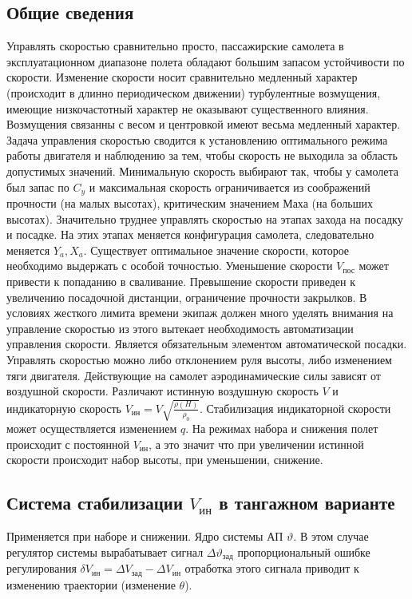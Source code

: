 \documentclass{article}
\begin{document}
\subsection{Общие сведения}
Управлять скоростью сравнительно просто, пассажирские самолета в
эксплуатационном диапазоне полета обладают большим запасом устойчивости по
скорости. Изменение скорости носит сравнительно медленный характер (происходит
в длинно периодическом движении) турбулентные возмущения, имеющие
низкочастотный характер не оказывают существенного влияния.
Возмущения связанны с весом и центровкой имеют весьма медленный характер.
Задача управления скоростью сводится к установлению оптимального режима работы
двигателя и наблюдению за тем, чтобы скорость не выходила за область допустимых
значений.
Минимальную скорость выбирают так, чтобы у самолета был запас по $C_y$ и
максимальная скорость ограничивается из соображений прочности (на малых
высотах), критическим значением Маха (на больших высотах).
Значительно труднее управлять скоростью на этапах захода на посадку и посадке.
На этих этапах меняется конфигурация самолета, следовательно меняется $Y_a,
X_a$.
Существует оптимальное значение скорости, которое необходимо выдержать с особой
точностью. Уменьшение скорости $V_\text{пос}$ может привести к попаданию в
сваливание. Превышение скорости приведен к увеличению посадочной дистанции,
ограничение прочности закрылков. В условиях жесткого лимита времени экипаж
должен много уделять внимания на управление скоростью из этого вытекает
необходимость автоматизации управления скорости. Является обязательным
элементом автоматической посадки.\\
Управлять скоростью можно либо отклонением руля высоты, либо изменением тяги
двигателя. Действующие на самолет аэродинамические силы зависят от воздушной
скорости. Различают истинную воздушную скорость $V$ и индикаторную скорость
$V_\text{ин} = V \sqrt{\frac{\rho(H)}{\rho_0}}$. Стабилизация индикаторной
скорости может осуществляется изменением $q$. На режимах набора и снижения полет
происходит с постоянной $ V_\text{ин} $, а это значит что при увеличении
истинной скорости происходит набор высоты, при уменьшении, снижение.

\subsection{Система стабилизации \texorpdfstring{$ V_\text{ин}$}{Lg} в
тангажном варианте}
Применяется при наборе и снижении. Ядро системы АП $\vartheta$. В этом случае
регулятор системы вырабатывает сигнал $\Delta \vartheta_\text{зад}$
пропорциональный ошибке регулирования $\delta V_\text{ин} = \Delta V_\text{зад}
- \Delta V_\text{ин}$ отработка этого сигнала приводит к изменению траектории
(изменение $\theta$).
\end{document}

